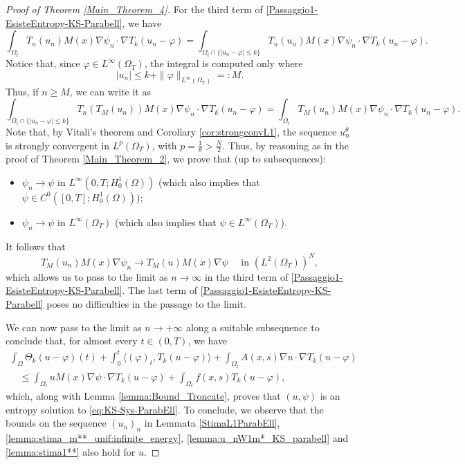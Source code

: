 \documentclass{amsart}
\numberwithin{equation}{section}
\def\elle#1{L^{#1}}
\def\elleomT#1{L^{#1}(\Omega_T)}
\def\Hom{H^1_0(\Omega)}
\def\io{\int_\Omega}
\def\iot{\int_{\Omega_t}}
\def\norma#1#2{ \|#1 \|_{#2}}
\newcommand{\abs}[1]{\left|#1\right|}
\begin{document}
\begin{proof}[Proof of Theorem \ref{Main_Theorem_4}]
    For the third term of \eqref{Passaggio1-EsisteEntropy-KS-Parabell}, we have 
    $$\iot T_n(u_n) M(x)\nabla \psi_n\cdot\nabla T_k(u_n-\varphi)=\int_{\Omega_t\cap\{\abs{u_n-\varphi}\leq k\}} T_n(u_n) M(x)\nabla \psi_n\cdot\nabla T_k(u_n-\varphi).$$
    Notice that, since $\varphi\in\elleomT\infty$, the integral is computed only where $$\abs{u_n}\leq k+\norma{\varphi}{\elleomT\infty}=:M.$$
    Thus, if $n\geq M$, we can write it as
    $$\int_{\Omega_t\cap\{\abs{u_n-\varphi}\leq k\}} T_n(T_M(u_n)) M(x)\nabla \psi_n\cdot\nabla T_k(u_n-\varphi)=
    \iot T_M(u_n) M(x)\nabla \psi_n\cdot\nabla T_k(u_n-\varphi).$$
    Note that, by Vitali's theorem and Corollary \ref{cor:strongconvL1}, the sequence $u_n^\theta$ is strongly convergent in $\elleomT p$, with $p=\frac1\theta>\frac{N}{2}$. Thus, by reasoning as in the proof of Theorem \ref{Main_Theorem_2}, we prove that (up to subsequences):
    \begin{itemize}
        \item $\psi_n\to\psi$ in $\elle\infty(0,T;\Hom)$ (which also implies that $\psi\in C^0([0,T];\Hom)$);
        \item $\psi_n\to\psi$ in $\elle\infty(\Omega_T)$ (which also implies that $\psi\in \elle\infty(\Omega_T)$).
    \end{itemize}
    It follows that
    $$ T_M(u_n) M(x)\nabla \psi_n\to T_M(u)M(x)\nabla\psi\quad\text{ in } \left(\elleomT 2\right)^N,$$
    which allows us to pass to the limit as $n\to\infty$ in the third term of \eqref{Passaggio1-EsisteEntropy-KS-Parabell}. The last term of \eqref{Passaggio1-EsisteEntropy-KS-Parabell} poses no difficulties in the passage to the limit.

    We can now pass to the limit as $n\to+\infty$ along a suitable subsequence to conclude that, for almost every $t\in(0,T)$, we have
    \begin{multline}
        \io \Theta_k(u-\varphi)(t)+\int_0^t \langle (\varphi)_t,T_k(u-\varphi)\rangle+
        \iot A(x,s)\nabla u\cdot \nabla T_k(u-\varphi)
        \\\quad  \leq\iot u M(x)\nabla \psi\cdot\nabla T_k(u-\varphi) + \iot f(x,s)T_k(u-\varphi),
    \end{multline}
    which, along with Lemma \ref{lemma:Bound_Troncate}, proves that $(u,\psi)$ is an entropy solution to \eqref{eq:KS-Sys-ParabEll}. To conclude, we observe that the bounds on the sequence $(u_n)_n$ in Lemmata \ref{StimaL1ParabEll}, \ref{lemma:stima_m**_unif:infinite_energy}, \ref{lemma:u_nW1m*_KS_parabell} and \ref{lemma:stima1**} also hold for $u$.
\end{proof}
\end{document}
